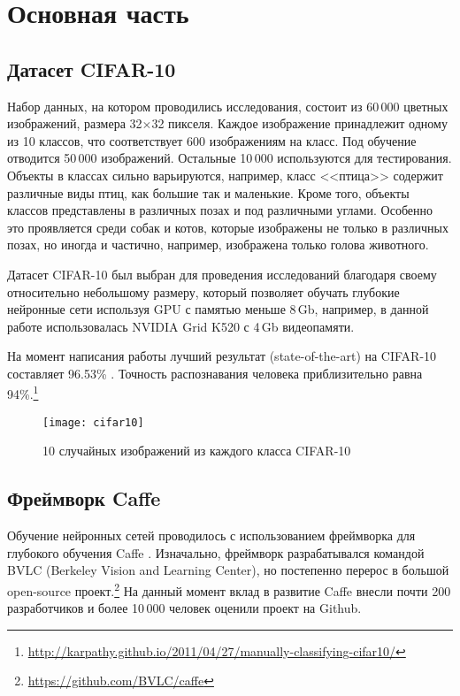 \section{Основная часть}
\subsection{Датасет CIFAR-10}
Набор данных, на котором проводились исследования, состоит из 60\,000 цветных изображений, размера 
32$\times$32 пикселя. Каждое изображение принадлежит одному из 10 классов, что соответствует 600 изображениям на класс. Под 
обучение отводится 50\,000 изображений. Остальные 10\,000 используются для тестирования. Объекты в классах сильно варьируются, 
например, класс <<птица>> содержит различные виды птиц, как большие так и маленькие. Кроме того, объекты классов представлены в 
различных позах и под различными углами. Особенно это проявляется среди собак и котов, которые изображены не только в различных 
позах, но иногда и частично, например, изображена только голова животного.

Датасет CIFAR-10 \cite{learningmultiple} был выбран для проведения исследований благодаря своему относительно небольшому размеру, 
который позволяет обучать глубокие нейронные сети используя GPU с памятью меньше 8\,Gb, например, в данной работе использовалась 
NVIDIA Grid K520 с 4\,Gb видеопамяти.

На момент написания работы лучший результат (state-of-the-art) на CIFAR-10 составляет 96.53\% \cite{2014arXiv1412}. Точность  
распознавания человека приблизительно равна 
94\%.\footnote{\url{http://karpathy.github.io/2011/04/27/manually-classifying-cifar10/}}

\begin{figure}[h]
\centering
\texttt{[image: cifar10]}
\caption{10 случайных изображений из каждого класса CIFAR-10}
\end{figure}

\subsection{Фреймворк Caffe}
Обучение нейронных сетей проводилось с использованием фреймворка для глубокого обучения Caffe \cite{jia2014caffe}.
Изначально, фреймворк разрабатывался командой BVLC (Berkeley Vision and Learning Center), но постепенно перерос в большой 
open-source проект.\footnote{\url{https://github.com/BVLC/caffe}} На данный момент вклад в развитие Caffe внесли почти 200 
разработчиков и более 10\,000 человек оценили проект на Github.

